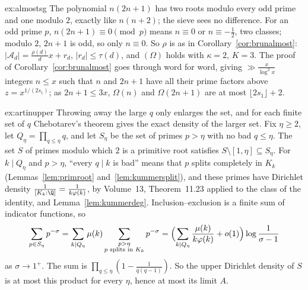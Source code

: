 \begin{solution}{ex:almostsg}
\idea The polynomial $n(2n+1)$ has two roots modulo every odd prime and one modulo $2$, exactly like $n(n+2)$; the sieve sees no difference.
\writeup For an odd prime $p$, $n(2n+1)\equiv0\pmod p$ means $n\equiv0$ or $n\equiv-\frac12$, two classes; modulo $2$, $2n+1$ is odd, so only $n\equiv0$. So $\rho$ is as in Corollary~\ref{cor:brunalmost}: $|\mathcal A_d|=\frac{\rho(d)}dx+r_d$, $|r_d|\le\tau(d)$, and $(\Omega)$ holds with $\kappa=2$, $K=3$. The proof of Corollary~\ref{cor:brunalmost} goes through word for word, giving $\gg\frac x{\log^2x}$ integers $n\le x$ such that $n$ and $2n+1$ have all their prime factors above $z=x^{1/(2s_1)}$; as $2n+1\le3x$, $\Omega(n)$ and $\Omega(2n+1)$ are at most $\lfloor2s_1\rfloor+2$.
\end{solution}

\begin{solution}{ex:artinupper}
\idea Throwing away the large $q$ only enlarges the set, and for each finite set of $q$ Chebotarev's theorem gives the exact density of the larger set.
\writeup Fix $\eta\ge2$, let $Q_\eta=\prod_{q\le\eta}q$, and let $S_\eta$ be the set of primes $p>\eta$ with no bad $q\le\eta$. The set $S$ of primes modulo which $2$ is a primitive root satisfies $S\setminus[1,\eta]\subseteq S_\eta$. For $k\mid Q_\eta$ and $p>\eta$, ``every $q\mid k$ is bad'' means that $p$ splits completely in $K_k$ (Lemmas~\ref{lem:primroot} and~\ref{lem:kummersplit}), and these primes have Dirichlet density $\frac1{[K_k:\Q]}=\frac1{k\varphi(k)}$, by Volume~13, Theorem~11.23 applied to the class of the identity, and Lemma~\ref{lem:kummerdeg}. Inclusion--exclusion is a finite sum of indicator functions, so
\[
\sum_{p\in S_\eta}p^{-\sigma}=\sum_{k\mid Q_\eta}\mu(k)\sum_{\substack{p>\eta\\p\text{ splits in }K_k}}p^{-\sigma}=\Bigl(\sum_{k\mid Q_\eta}\frac{\mu(k)}{k\varphi(k)}+o(1)\Bigr)\log\frac1{\sigma-1}
\]
as $\sigma\to1^+$. The sum is $\prod_{q\le\eta}(1-\frac1{q(q-1)})$. So the upper Dirichlet density of $S$ is at most this product for every $\eta$, hence at most its limit $A$.
\end{solution}

